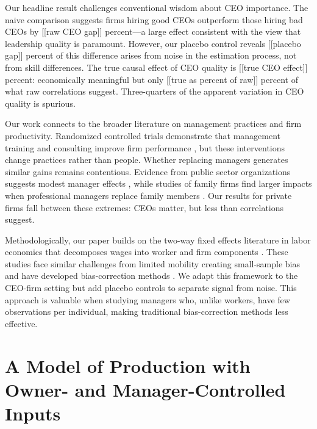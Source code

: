 \documentclass[11pt,a4paper]{article}
\begin{document}
Our headline result challenges conventional wisdom about CEO importance. The naive comparison suggests firms hiring good CEOs outperform those hiring bad CEOs by [[raw CEO gap]] percent—a large effect consistent with the view that leadership quality is paramount. However, our placebo control reveals [[placebo gap]] percent of this difference arises from noise in the estimation process, not from skill differences. The true causal effect of CEO quality is [[true CEO effect]] percent: economically meaningful but only [[true as percent of raw]] percent of what raw correlations suggest. Three-quarters of the apparent variation in CEO quality is spurious.

Our work connects to the broader literature on management practices and firm productivity. Randomized controlled trials demonstrate that management training and consulting improve firm performance \citep{bloom2013does}, but these interventions change practices rather than people. Whether replacing managers generates similar gains remains contentious. Evidence from public sector organizations suggests modest manager effects \citep{fenizia2022managers, janke2024role}, while studies of family firms find larger impacts when professional managers replace family members \citep{bennedsen2007inside}. Our results for private firms fall between these extremes: CEOs matter, but less than correlations suggest.

Methodologically, our paper builds on the two-way fixed effects literature in labor economics that decomposes wages into worker and firm components \citep{Abowd1999Econometrica, Card2018JoLE}. These studies face similar challenges from limited mobility creating small-sample bias \citep{andrews2008high} and have developed bias-correction methods \citep{Bonhomme2023-dx, gaure2014correlation}. We adapt this framework to the CEO-firm setting but add placebo controls to separate signal from noise. This approach is valuable when studying managers who, unlike workers, have few observations per individual, making traditional bias-correction methods less effective.

\section{A Model of Production with Owner- and Manager-Controlled Inputs}
\end{document}
